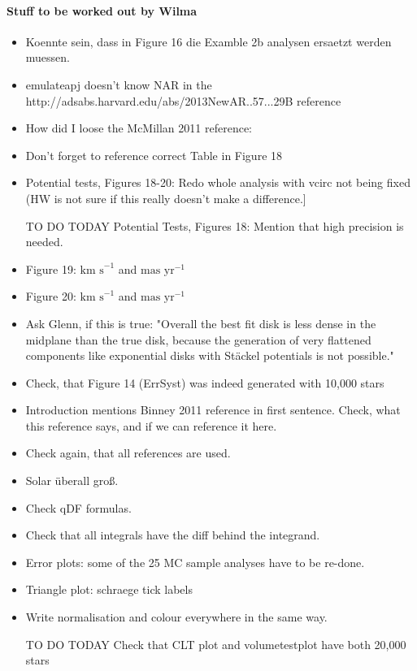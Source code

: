 \paragraph{Stuff to be worked out by Wilma}
\begin{itemize}
\item Koennte sein, dass in Figure 16 die Examble 2b analysen ersaetzt werden muessen.
\item emulateapj doesn't know NAR in the http://adsabs.harvard.edu/abs/2013NewAR..57...29B reference
\item How did I loose the McMillan 2011 reference: %
\item Don't forget to reference correct Table in Figure 18
\item Potential tests, Figures 18-20: Redo whole analysis with vcirc not being fixed (HW is not sure if this really doesn't make a difference.]
\item [TO DO TODAY] Potential Tests, Figures 18: Mention that high precision is needed.
\item Figure 19: $\text{km s}^{-1}$ and $\text{mas yr}^{-1}$
\item Figure 20: $\text{km s}^{-1}$ and $\text{mas yr}^{-1}$
\item Ask Glenn, if this is true: "Overall the best fit disk is less dense in the midplane than the true disk, because the generation of very flattened components like exponential disks with St\"{a}ckel potentials is not possible."
\item Check, that Figure 14 (ErrSyst) was indeed generated with 10,000 stars
\item Introduction mentions Binney 2011 reference in first sentence. Check, what this reference says, and if we can reference it here.
\item Check again, that all references are used.
\item Solar überall groß.
\item Check qDF formulas.
\item Check that all integrals have the diff behind the integrand.
\item Error plots: some of the 25 MC sample analyses have to be re-done.
\item Triangle plot: schraege tick labels
\item Write normalisation and colour everywhere in the same way.
\item [TO DO TODAY] Check that CLT plot and volumetestplot have both 20,000 stars

\end{itemize}
